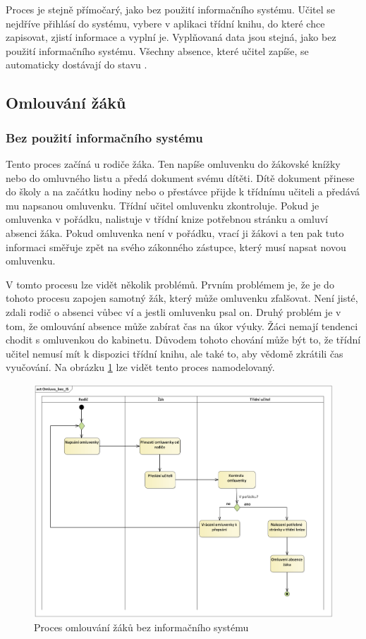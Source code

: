 Proces je stejně přímočarý, jako bez použití informačního systému. Učitel se nejdříve přihlásí do systému, vybere v aplikaci třídní knihu, do které chce zapisovat, zjistí informace a vyplní je. Vyplňovaná data jsou stejná, jako bez použití informačního systému. Všechny absence, které učitel zapíše, se automaticky dostávají do stavu .

\subsection{Omlouvání žáků}
\subsubsection*{Bez použití informačního systému}
Tento proces začíná u rodiče žáka. Ten napíše omluvenku do žákovské knížky nebo do omluvného listu a předá dokument svému dítěti. Dítě dokument přinese do školy a na začátku hodiny nebo o přestávce přijde k třídnímu učiteli a předává mu napsanou omluvenku. Třídní učitel omluvenku zkontroluje. Pokud je omluvenka v pořádku, nalistuje v třídní knize potřebnou stránku a omluví absenci žáka. Pokud omluvenka není v pořádku, vrací ji žákovi a ten pak tuto informaci směřuje zpět na svého zákonného zástupce, který musí napsat novou omluvenku.

V tomto procesu lze vidět několik problémů. Prvním problémem je, že je do tohoto procesu zapojen samotný žák, který může omluvenku zfalšovat. Není jisté, zdali rodič o absenci vůbec ví a jestli omluvenku psal on. Druhý problém je v tom, že omlouvání absence může zabírat čas na úkor výuky. Žáci nemají tendenci chodit s omluvenkou do kabinetu. Důvodem tohoto chování může být to, že třídní učitel nemusí mít k dispozici třídní knihu, ale také to, aby vědomě zkrátili čas vyučování.
Na obrázku \ref{omluva_bez_IS} lze vidět tento proces namodelovaný.
\clearpage

\begin{figure}[H]
	\centering
	\includegraphics[width=\textwidth]{images/Omluva_bez_IS.png}
	\caption{Proces omlouvání žáků bez informačního systému}
	\label{omluva_bez_IS}
\end{figure}

